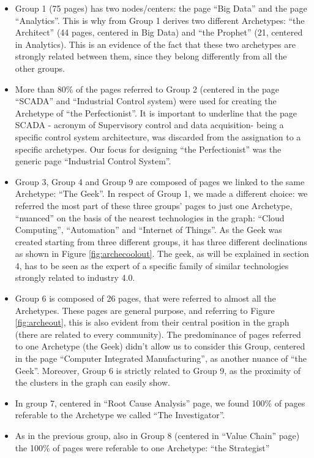 \documentclass[]{book}
\begin{document}
\begin{itemize}
\item
  Group 1 (75 pages) has two nodes/centers: the page ``Big Data'' and
  the page ``Analytics''. This is why from Group 1 derives two different
  Archetypes: ``the Architect'' (44 pages, centered in Big Data) and
  ``the Prophet'' (21, centered in Analytics). This is an evidence of
  the fact that these two archetypes are strongly related between them,
  since they belong differently from all the other groups.
\item
  More than 80\% of the pages referred to Group 2 (centered in the page
  ``SCADA'' and ``Industrial Control system) were used for creating the
  Archetype of ``the Perfectionist''. It is important to underline that
  the page SCADA - acronym of Supervisory control and data acquisition-
  being a specific control system architecture, was discarded from the
  assignation to a specific archetypes. Our focus for designing ``the
  Perfectionist'' was the generic page ``Industrial Control System''.
\item
  Group 3, Group 4 and Group 9 are composed of pages we linked to the
  same Archetype: ``The Geek''. In respect of Group 1, we made a
  different choice: we referred the most part of these three groups'
  pages to just one Archetype, ``nuanced'' on the basis of the nearest
  technologies in the graph: ``Cloud Computing'', ``Automation'' and
  ``Internet of Things''. As the Geek was created starting from three
  different groups, it has three different declinations as shown in
  Figure \ref{fig:archecoolout}. The geek, as will be explained in
  section 4, has to be seen as the expert of a specific family of
  similar technologies strongly related to industry 4.0.
\item
  Group 6 is composed of 26 pages, that were referred to almost all the
  Archetypes. These pages are general purpose, and referring to Figure
  \ref{fig:archeout}, this is also evident from their central position
  in the graph (there are related to every community). The predominance
  of pages referred to one Archetype (the Geek) didn't allow us to
  consider this Group, centered in the page ``Computer Integrated
  Manufacturing'', as another nuance of ``the Geek''. Moreover, Group 6
  is strictly related to Group 9, as the proximity of the clusters in
  the graph can easily show.
\item
  In group 7, centered in ``Root Cause Analysis'' page, we found 100\%
  of pages referable to the Archetype we called ``The Investigator''.
\item
  As in the previous group, also in Group 8 (centered in ``Value Chain''
  page) the 100\% of pages were referable to one Archetype: ``the
  Strategist''
\end{itemize}
\end{document}
